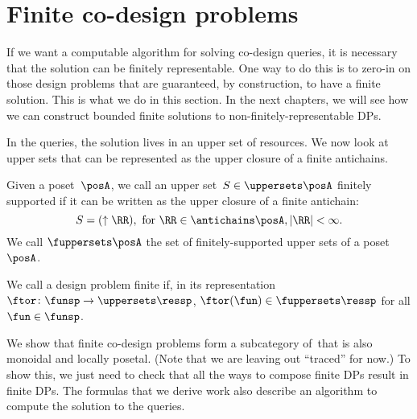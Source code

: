 \section{Finite co-design problems}

If we want a computable algorithm for solving co-design queries, it is necessary that the solution can be finitely representable.
One way to do this is to zero-in on those design problems that are guaranteed, by construction, to have a finite solution.
This is what we do in this section.
In the next chapters, we will see how we can construct bounded finite solutions to non-finitely-representable DPs.

In the \FixFunMinRes queries, the solution lives in an upper set of resources.
We now look at upper sets that can be represented as the upper closure of a finite antichains.

\begin{definition}
    \label{def:fuppersets}
    Given a poset~$\posA$, we call an upper set~$S \in \uppersets \posA$ finitely supported
    if it can be written as the upper closure of a finite antichain:
    \begin{equation}
        S = (\uparrow\RR), \text{ for } \RR \in \antichains \posA, |\RR| < \infty.
    \end{equation}
    We call $\fuppersets \posA$ the set of finitely-supported upper sets of a poset~$\posA$.
\end{definition}

\begin{definition}
    We call a design problem finite if, in its representation $\ftor \colon \funsp \to \uppersets \ressp$,
    $\ftor(\fun) \in \fuppersets\ressp$ for all $\fun\in\funsp$.
\end{definition}

We show that finite co-design problems form a subcategory of~\DP that is also monoidal and locally posetal.
(Note that we are leaving out ``traced'' for now.) To show this, we just need to check that all the ways to compose finite DPs result in finite DPs.
The formulas that we derive work also describe an algorithm to compute the solution to the queries.

